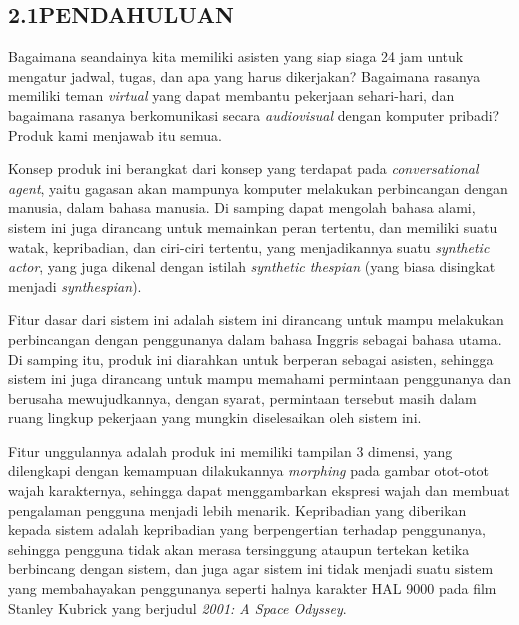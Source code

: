 \subsection*{\textsf{\normalsize 2.1\hspace{0.5cm}PENDAHULUAN}}

Bagaimana seandainya kita memiliki asisten yang siap siaga 24 jam untuk mengatur jadwal, tugas, dan apa yang harus dikerjakan? Bagaimana rasanya memiliki teman \textit{virtual} yang dapat membantu pekerjaan sehari-hari, dan bagaimana rasanya berkomunikasi secara \textit{audiovisual} dengan komputer pribadi? Produk kami menjawab itu semua.

Konsep produk ini berangkat dari konsep yang terdapat pada \textit{conversational agent}, yaitu gagasan akan mampunya komputer melakukan perbincangan dengan manusia, dalam bahasa manusia.
Di samping dapat mengolah bahasa alami, sistem ini juga dirancang untuk memainkan peran tertentu, dan memiliki suatu watak, kepribadian, dan ciri-ciri tertentu, yang menjadikannya suatu \textit{synthetic actor}, yang juga dikenal dengan istilah \textit{synthetic thespian} (yang biasa disingkat menjadi \textit{synthespian}).

Fitur dasar dari sistem ini adalah sistem ini dirancang untuk mampu melakukan perbincangan dengan penggunanya dalam bahasa Inggris sebagai bahasa utama.
Di samping itu, produk ini diarahkan untuk berperan sebagai asisten, sehingga sistem ini juga dirancang untuk mampu memahami permintaan penggunanya dan berusaha mewujudkannya, dengan syarat, permintaan tersebut masih dalam ruang lingkup pekerjaan yang mungkin diselesaikan oleh sistem ini.

Fitur unggulannya adalah produk ini memiliki tampilan 3 dimensi, yang dilengkapi dengan kemampuan dilakukannya \textit{morphing} pada gambar otot-otot wajah karakternya, sehingga dapat menggambarkan ekspresi wajah dan membuat pengalaman pengguna menjadi lebih menarik.
Kepribadian yang diberikan kepada sistem adalah kepribadian yang berpengertian terhadap penggunanya, sehingga pengguna tidak akan merasa tersinggung ataupun tertekan ketika berbincang dengan sistem, dan juga agar sistem ini tidak menjadi suatu sistem yang membahayakan penggunanya seperti halnya karakter HAL 9000 pada film Stanley Kubrick yang berjudul \emph{2001: A Space Odyssey}.

